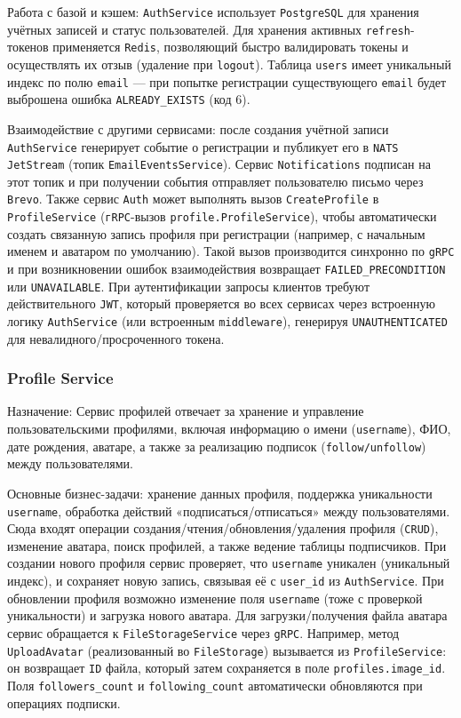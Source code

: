 Работа с базой и кэшем: \texttt{AuthService} использует \texttt{PostgreSQL} для хранения учётных записей и статус пользователей. Для хранения активных \texttt{refresh}-токенов применяется \texttt{Redis}, позволяющий быстро валидировать токены и осуществлять их отзыв (удаление при \texttt{logout}). Таблица \texttt{users} имеет уникальный индекс по полю \texttt{email} — при попытке регистрации существующего \texttt{email} будет выброшена ошибка \texttt{ALREADY\_EXISTS} (код 6).

Взаимодействие с другими сервисами: после создания учётной записи \texttt{AuthService} генерирует событие о регистрации и публикует его в \texttt{NATS JetStream} (топик \texttt{EmailEventsService}). Сервис \texttt{Notifications} подписан на этот топик и при получении события отправляет пользователю письмо через \texttt{Brevo}. Также сервис \texttt{Auth} может выполнять вызов \texttt{CreateProfile} в \texttt{ProfileService} (\texttt{гRPC}-вызов \texttt{profile.ProfileService}), чтобы автоматически создать связанную запись профиля при регистрации (например, с начальным именем и аватаром по умолчанию). Такой вызов производится синхронно по \texttt{gRPC} и при возникновении ошибок взаимодействия возвращает \texttt{FAILED\_PRECONDITION} или \texttt{UNAVAILABLE}. При аутентификации запросы клиентов требуют действительного \texttt{JWT}, который проверяется во всех сервисах через встроенную логику \texttt{AuthService} (или встроенным \texttt{middleware}), генерируя \texttt{UNAUTHENTICATED} для невалидного/просроченного токена.

\subsubsection*{Profile Service}
Назначение: Сервис профилей отвечает за хранение и управление пользовательскими профилями, включая информацию о имени (\texttt{username}), ФИО, дате рождения, аватаре, а также за реализацию подписок (\texttt{follow/unfollow}) между пользователями.

Основные бизнес-задачи: хранение данных профиля, поддержка уникальности \texttt{username}, обработка действий «подписаться/отписаться» между пользователями. Сюда входят операции создания/чтения/обновления/удаления профиля (\texttt{CRUD}), изменение аватара, поиск профилей, а также ведение таблицы подписчиков. При создании нового профиля сервис проверяет, что \texttt{username} уникален (уникальный индекс), и сохраняет новую запись, связывая её с \texttt{user\_id} из \texttt{AuthService}. При обновлении профиля возможно изменение поля \texttt{username} (тоже с проверкой уникальности) и загрузка нового аватара. Для загрузки/получения файла аватара сервис обращается к \texttt{FileStorageService} через \texttt{gRPC}. Например, метод \texttt{UploadAvatar} (реализованный во \texttt{FileStorage}) вызывается из \texttt{ProfileService}: он возвращает \texttt{ID} файла, который затем сохраняется в поле \texttt{profiles.image\_id}. Поля \texttt{followers\_count} и \texttt{following\_count} автоматически обновляются при операциях подписки.

